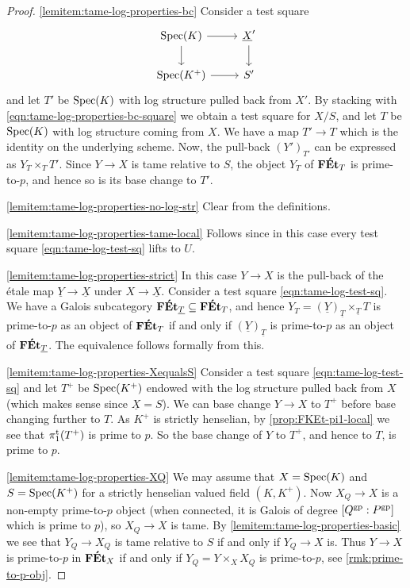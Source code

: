 \begin{proof}
\ref{lemitem:tame-log-properties-bc} 
Consider a test square 
    \[
        \begin{tikzcd}
            \Spec(K)\ar[r] \ar[d] & \underline{X}'\ar[d] \\
            \Spec(K^+) \ar[r] & S'
        \end{tikzcd}
    \]
and let $T'$ be $\operatorname{Spec}(K)$ with log structure pulled back from $X'$. By stacking with \eqref{eqn:tame-log-properties-bc-square} we obtain a test square for $X/S$, and let $T$ be $\operatorname{Spec}(K)$ with log structure coming from $X$. We have a map $T'\to T$ which is the identity on the underlying scheme. Now, the pull-back $(Y')_{T'}$ can be expressed as $Y_T\times_T T'$. Since $Y\to X$ is tame relative to $S$, the object $Y_T$ of $\mathbf{F\acute{E}t}_T$ is prime-to-$p$, and hence so is its base change to $T'$.

\ref{lemitem:tame-log-properties-no-log-str} 
Clear from the definitions.

\ref{lemitem:tame-log-properties-tame-local} 
Follows since in this case 
every test square \eqref{eqn:tame-log-test-sq} lifts to $U$.

\ref{lemitem:tame-log-properties-strict} 
In this case $Y\to X$ is the pull-back of the \'etale map $\underline{Y}\to\underline{X}$ under $X\to\underline{X}$. Consider a test square \eqref{eqn:tame-log-test-sq}. We have a Galois subcategory $\mathbf{F\acute{E}t}_{\underline{T}}\subseteq \mathbf{F\acute{E}t}_T$, and hence $Y_T = (\underline{Y})_{\underline T}\times_{\underline{T}} T$ is prime-to-$p$ as an object of $\mathbf{F\acute{E}t}_T$ if and only if $(\underline{Y})_{\underline T}$ is prime-to-$p$ as an object of $\mathbf{F\acute{E}t}_{\underline{T}}$. The equivalence follows formally from this.  

\ref{lemitem:tame-log-properties-XequalsS} 
Consider a test square \eqref{eqn:tame-log-test-sq} and let $T^+$ be $\operatorname{Spec}(K^+)$ endowed with the log structure pulled back from $X$ (which makes sense since $\underline{X}=S$). We can base change $Y\to X$ to $T^+$ before base changing further to $T$. As $K^+$ is strictly henselian, by \cref{prop:FKEt-pi1-local} we see that $\pi_1^{\mathrm{t}}(T^+)$ is prime to $p$. So the base change of $Y$ to $T^+$, and hence to $T$, is prime to $p$.

\ref{lemitem:tame-log-properties-XQ} We may assume that $X=\operatorname{Spec}(K)$ and $S=\operatorname{Spec}(K^+)$ for a strictly henselian valued field $(K,K^+)$.
Now $X_Q\to X$ is a non-empty prime-to-$p$ object (when connected, it is Galois of degree $[Q^{\rm gp}:P^{\rm gp}]$ which is prime to $p$), so $X_Q\to X$ is tame.
By \ref{lemitem:tame-log-properties-basic} we see that $Y_Q\to X_Q$ is tame relative to $S$ if and only if $Y_Q\to X$ is.  Thus $Y\to X$ is prime-to-$p$ in $\mathbf{F\acute{E}t}_X$ if and only if $Y_Q = Y \times_X X_Q$ is prime-to-$p$, see  \cref{rmk:prime-to-p-obj}.
\end{proof}


